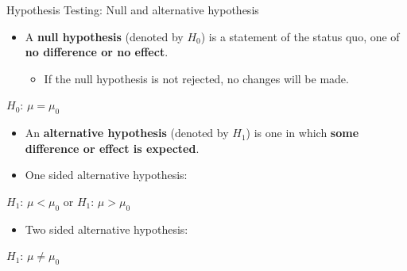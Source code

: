 \documentclass[
  ignorenonframetext,
]{beamer}
\providecommand{\tightlist}{%
  \setlength{\itemsep}{0pt}\setlength{\parskip}{0pt}}
\begin{document}
\begin{frame}{Hypothesis Testing: Null and alternative hypothesis}
\label{hypothesis-testing-null-and-alternative-hypothesis}
\begin{itemize}
\tightlist
\item
  A \textbf{null hypothesis} (denoted by \(H_0\)) is a statement of the
  status quo, one of \textbf{no difference or no effect}.

  \begin{itemize}
  \tightlist
  \item
    If the null hypothesis is not rejected, no changes will be made.
  \end{itemize}
\end{itemize}

\centering

\(H_0\): \(\mu = \mu_0\)\\

\vspace{1cm}

\begin{itemize}
\item
  An \textbf{alternative hypothesis} (denoted by \(H_1\)) is one in
  which \textbf{some difference or effect is expected}.
\item
  One sided alternative hypothesis:
\end{itemize}

\centering

\(H_1\): \(\mu < \mu_0\) or \(H_1\): \(\mu > \mu_0\)\\

\begin{itemize}
\tightlist
\item
  Two sided alternative hypothesis:
\end{itemize}

\centering

\(H_1\): \(\mu \neq \mu_0\)\\
\end{frame}
\end{document}
